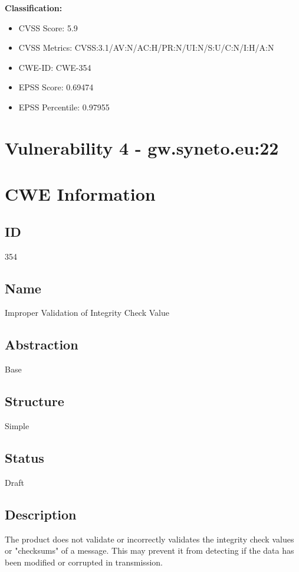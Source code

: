 \textbf{Classification:}
\begin{itemize}
\item CVSS Score: 5.9
\item CVSS Metrics: CVSS:3.1/AV:N/AC:H/PR:N/UI:N/S:U/C:N/I:H/A:N
\item CWE-ID: CWE-354
\item EPSS Score: 0.69474
\item EPSS Percentile: 0.97955
\end{itemize}



\section*{Vulnerability 4 - gw.syneto.eu:22}

\section*{CWE Information}
\subsection*{ID}
354

\subsection*{Name}
Improper Validation of Integrity Check Value

\subsection*{Abstraction}
Base

\subsection*{Structure}
Simple

\subsection*{Status}
Draft

\subsection*{Description}
The product does not validate or incorrectly validates the integrity check values or "checksums" of a message. This may prevent it from detecting if the data has been modified or corrupted in transmission.

